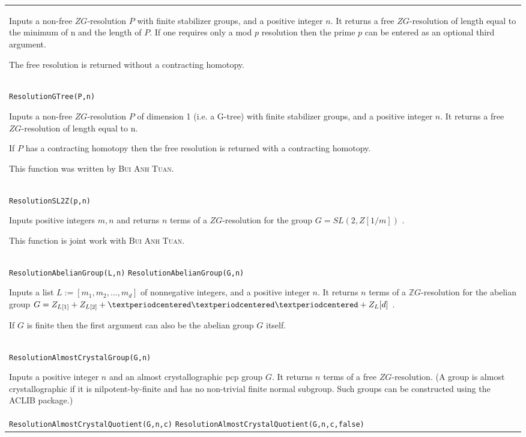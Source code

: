 \documentclass[a4paper,11pt]{report}
\begin{document}
{\begin{center}
\begin{tabular}{|l|}
 Inputs a non-free $ZG$-resolution $P$ with finite stabilizer groups, and a positive integer $n$. It returns a free $ZG$-resolution of length equal to the minimum of n and the length of $P$. If one requires only a mod $p$ resolution then the prime $p$ can be entered as an optional third argument. 

 The free resolution is returned without a contracting homotopy. \\
 \index{ResolutionGTree} \texttt{ResolutionGTree(P,n)} 

 Inputs a non-free $ZG$-resolution $P$ of dimension 1 (i.e. a G-tree) with finite stabilizer groups, and a positive
integer $n$. It returns a free $ZG$-resolution of length equal to n. 

 If $P$ has a contracting homotopy then the free resolution is returned with a
contracting homotopy. 

 This function was written by \textsc{ Bui Anh Tuan}. \\
 \index{ResolutionSL2Z} \texttt{ResolutionSL2Z(p,n)} 

 Inputs positive integers $m, n$ and returns $n$ terms of a $ZG$-resolution for the group $G=SL(2,Z[1/m])$ . 

 

 This function is joint work with \textsc{Bui Anh Tuan}. \\
 \index{ResolutionAbelianGroup} \texttt{ResolutionAbelianGroup(L,n)} \texttt{ResolutionAbelianGroup(G,n)} 

 Inputs a list $L:=[m_1,m_2, ..., m_d]$ of nonnegative integers, and a positive integer $n$. It returns $n$ terms of a ${\mathbb Z}G$-resolution for the abelian group $G=Z_{L[1]}+Z_{L[2]}+{\textperiodcentered}{\textperiodcentered}{\textperiodcentered}+{Z_L[d]}$ . 

 If $G$ is finite then the first argument can also be the abelian group $G$ itself. \\
 \index{ResolutionAlmostCrystalGroup} \texttt{ResolutionAlmostCrystalGroup(G,n)} 

 Inputs a positive integer $n$ and an almost crystallographic pcp group $G$. It returns $n$ terms of a free $ZG$-resolution. (A group is almost crystallographic if it is nilpotent-by-finite
and has no non-trivial finite normal subgroup. Such groups can be constructed
using the ACLIB package.) \\
 \index{ResolutionAlmostCrystalQuotient} \texttt{ResolutionAlmostCrystalQuotient(G,n,c)} \texttt{ResolutionAlmostCrystalQuotient(G,n,c,false)} 


\end{tabular}
\end{center}}
\end{document}
